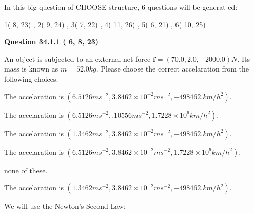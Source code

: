\documentclass[12pt]{article}
\begin{document}
   
\vspace{0.2in}
   
 In this big question of CHOOSE structure,           6 questions will be generat
 ed: 
  
  
            1(          8,         23)
 ,
            2(          9,         24)
 ,
            3(          7,         22)
 ,
            4(         11,         26)
 ,
            5(          6,         21)
 ,
            6(         10,         25)
 .
  
\vspace{0.2in}
  
{\textbf{\Large{Question
34.1.1 
 (          6,          8,         23)
}}}
  
  
 
An object is subjected to an external net force $\mathbf{f}=(
70.0 ,
2.0,
-2000.0  )N$. Its mass is known as
$m= %
52.0  kg$. Please choose the correct accelaration
from the following choices.
 
 
 
The accelaration is
$(
6.5126ms^{-2},
3.8462 \times 10^{-2}ms^{-2},
-498462.km/h^2
).
$
 
 
The accelaration is
$(
6.5126ms^{-2},
.10556ms^{-2},
1.7228 \times 10^{6}km/h^2
).
$
 
 
The accelaration is
$(
1.3462ms^{-2},
3.8462 \times 10^{-2}ms^{-2},
-498462.km/h^2
).
$
 
 
The accelaration is
$(
6.5126ms^{-2},
3.8462 \times 10^{-2}ms^{-2},
1.7228 \times 10^{6}km/h^2
).
$
 
 
none of these.
 
 
\noindent{}
 
 
The accelaration is
$(
1.3462ms^{-2},
3.8462 \times 10^{-2}ms^{-2},
-498462.km/h^2
).
$
 
 
\noindent{}
 
 
 
 
 
 
\noindent{}
 
 

We will use the Newton's Second Law:
 
\end{document}
